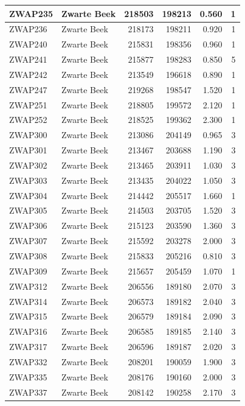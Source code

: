 \documentclass[11pt,]{book}
\begin{document}
\begin{table}
\begin{tabular}[t]{l|l|r|r|r|r}
\hline
ZWAP235 & Zwarte Beek & 218503 & 198213 & 0.560 & 1\\
\hline
ZWAP236 & Zwarte Beek & 218173 & 198211 & 0.920 & 1\\
\hline
ZWAP240 & Zwarte Beek & 215831 & 198356 & 0.960 & 1\\
\hline
ZWAP241 & Zwarte Beek & 215877 & 198283 & 0.850 & 5\\
\hline
ZWAP242 & Zwarte Beek & 213549 & 196618 & 0.890 & 1\\
\hline
ZWAP247 & Zwarte Beek & 219268 & 198547 & 1.520 & 1\\
\hline
ZWAP251 & Zwarte Beek & 218805 & 199572 & 2.120 & 1\\
\hline
ZWAP252 & Zwarte Beek & 218525 & 199362 & 2.300 & 1\\
\hline
ZWAP300 & Zwarte Beek & 213086 & 204149 & 0.965 & 3\\
\hline
ZWAP301 & Zwarte Beek & 213467 & 203688 & 1.190 & 3\\
\hline
ZWAP302 & Zwarte Beek & 213465 & 203911 & 1.030 & 3\\
\hline
ZWAP303 & Zwarte Beek & 213435 & 204022 & 1.050 & 3\\
\hline
ZWAP304 & Zwarte Beek & 214442 & 205517 & 1.660 & 1\\
\hline
ZWAP305 & Zwarte Beek & 214503 & 203705 & 1.520 & 3\\
\hline
ZWAP306 & Zwarte Beek & 215123 & 203590 & 1.360 & 3\\
\hline
ZWAP307 & Zwarte Beek & 215592 & 203278 & 2.000 & 3\\
\hline
ZWAP308 & Zwarte Beek & 215833 & 205216 & 0.810 & 3\\
\hline
ZWAP309 & Zwarte Beek & 215657 & 205459 & 1.070 & 1\\
\hline
ZWAP312 & Zwarte Beek & 206556 & 189180 & 2.070 & 3\\
\hline
ZWAP314 & Zwarte Beek & 206573 & 189182 & 2.040 & 3\\
\hline
ZWAP315 & Zwarte Beek & 206579 & 189184 & 2.090 & 3\\
\hline
ZWAP316 & Zwarte Beek & 206585 & 189185 & 2.140 & 3\\
\hline
ZWAP317 & Zwarte Beek & 206596 & 189187 & 2.020 & 3\\
\hline
ZWAP332 & Zwarte Beek & 208201 & 190059 & 1.900 & 3\\
\hline
ZWAP335 & Zwarte Beek & 208176 & 190160 & 2.000 & 3\\
\hline
ZWAP337 & Zwarte Beek & 208142 & 190258 & 2.170 & 3\\

\end{tabular}
\end{table}
\end{document}
